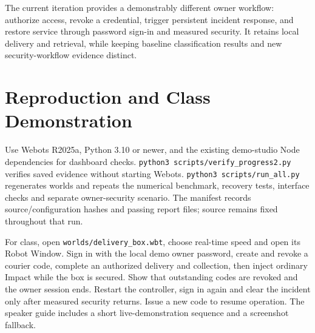 \documentclass[conference,letterpaper]{IEEEtran}
\newcommand{\code}[1]{\texttt{\small #1}}
\begin{document}
The current iteration provides a demonstrably different owner workflow: authorize access, revoke a credential, trigger persistent incident response, and restore service through password sign-in and measured security. It retains local delivery and retrieval, while keeping baseline classification results and new security-workflow evidence distinct.

\appendices
\section{Reproduction and Class Demonstration}
Use Webots R2025a, Python 3.10 or newer, and the existing demo-studio Node dependencies for dashboard checks. \code{python3 scripts/verify\_progress2.py} verifies saved evidence without starting Webots. \code{python3 scripts/run\_all.py} regenerates worlds and repeats the numerical benchmark, recovery tests, interface checks and separate owner-security scenario. The manifest records \SourceCount{} source/configuration hashes and \ReportCount{} passing report files; source remains fixed throughout that run.

For class, open \code{worlds/delivery\_box.wbt}, choose real-time speed and open its Robot Window. Sign in with the local demo owner password, create and revoke a courier code, complete an authorized delivery and collection, then inject ordinary Impact while the box is secured. Show that outstanding codes are revoked and the owner session ends. Restart the controller, sign in again and clear the incident only after measured security returns. Issue a new code to resume operation. The speaker guide includes a short live-demonstration sequence and a screenshot fallback.
\end{document}
